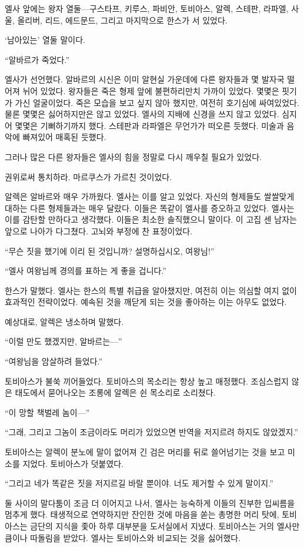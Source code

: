 엘사 앞에는 왕자 열둘—구스타프, 키루스, 파비안, 토비아스, 알렉, 스테판, 라파엘, 사울, 올리버, 리드, 에드문드, 그리고 마지막으로 한스가 서 있었다.

`남아있는' 열둘 말이다.

``알바르가 죽었다.''

엘사가 선언했다. 알바르의 시신은 이미 알현실 가운데에 다른 왕자들과 몇 발자국 떨어져 뉘어 있었다. 왕자들은 죽은 형제 앞에 불편하리만치 가까이 있었다. 몇몇은 핏기가 가신 얼굴이었다. 죽은 모습을 보고 싶지 않아 했지만, 여전히 호기심에 싸여있었다. 물론 몇몇은 싫어하지만은 않고 있었다. 엘사의 지배에 신경을 쓰지 않고 있었다. 심지어 몇몇은 기뻐하기까지 했다. 스테판과 라파엘은 무언가가 떠오른 듯했다. 미술과 음악에 빠져있어 매혹된 듯했다.

그러나 많은 다른 왕자들은 엘사의 힘을 정말로 다시 깨우칠 필요가 있었다.

권위로써 통치하라. 마르쿠스가 가르친 것이었다.

알렉은 알바르와 매우 가까웠다. 엘사는 이를 알고 있었다. 자신의 형제들도 쌀쌀맞게 대하는 다른 형제들과는 매우 달랐다. 이들은 똑같이 엘사를 증오하고 있었다. 엘사는 이를 감탄할 만하다고 생각했다. 이들은 최소한 솔직했으니 말이다. 이 고집 센 남자는 앞으로 나아가 다그쳤다. 고뇌와 부정에 찬 표정이었다.

``무슨 짓을 했기에 이리 된 것입니까? 설명하십시오, 여왕님!''

``엘사 여왕님께 경의를 표하는 게 좋을 겁니다.''

한스가 말했다. 엘사는 한스의 특별 취급을 알아챘지만, 여전히 이는 의심할 여지 없이 효과적인 전략이었다. 예속된 것을 깨닫게 되는 것을 좋아하는 이는 아무도 없었다.

예상대로, 알렉은 냉소하며 말했다.

``이럴 만도 했겠지만, 알바르는—''

``여왕님을 암살하려 들었다.''

토비아스가 불쑥 끼어들었다. 토비아스의 목소리는 항상 높고 매정했다. 조심스럽지 않은 태도에서 묻어나오는 조롱에 알렉은 쉰 목소리로 소리쳤다.

``이 망할 책벌레 놈이—''

``그래, 그리고 그놈이 조금이라도 머리가 있었으면 반역을 저지르려 하지도 않았겠지.''

토비아스는 알렉이 분노에 말이 없어져 긴 검은 머리를 뒤로 쓸어넘기는 것을 보고 미소를 지었다. 토비아스가 덧붙였다.

``그리고 네가 똑같은 짓을 저지르길 바랄 뿐이야. 너도 제거할 수 있게 말이지.''

둘 사이의 말다툼이 조금 더 이어지고 나서, 엘사는 능숙하게 이들의 진부한 입씨름을 멈추게 했다. 태생적으로 연약하지만 잔인한 것에 마음을 쏟는 총명한 머리 탓에, 토비아스는 금단의 지식을 좇아 하루 대부분을 도서실에서 지냈다. 토비아스는 거의 엘사만큼이나 따돌림을 받았다. 엘사는 토비아스와 비교되는 것을 싫어했다.

